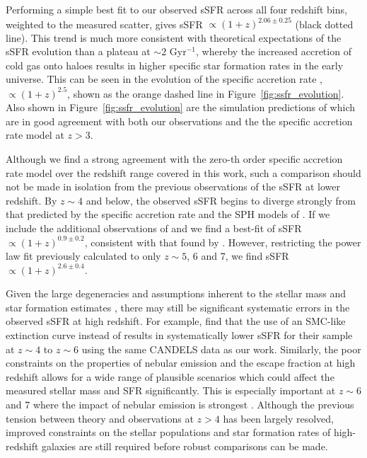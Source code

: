 Performing a simple best fit to our observed sSFR across all four redshift bins, weighted to the measured scatter, gives sSFR $\propto (1 + z)^{2.06 \pm 0.25}$ (black dotted line). This trend is much more consistent with theoretical expectations of the sSFR evolution than a plateau at $\sim 2$ Gyr$^{-1}$, whereby the increased accretion of cold gas onto haloes results in higher specific star formation rates in the early universe. This can be seen in the evolution of the specific accretion rate \citep{Neistein:2007fg,Dekel:2013id}, $\propto (1 + z)^{2.5}$, shown as the orange dashed line in Figure~\ref{fig:ssfr_evolution}. Also shown in Figure~\ref{fig:ssfr_evolution} are the simulation predictions of \citet{Dave:2013bf} which are in good agreement with both our observations and the the specific accretion rate model at $z > 3$. 

Although we find a strong agreement with the zero-th order specific accretion rate model over the redshift range covered in this work, such a comparison should not be made in isolation from the previous observations of the sSFR at lower redshift. By $z \sim 4$ and below, the observed sSFR begins to diverge strongly from that predicted by the specific accretion rate and the SPH models of \citet{Dave:2013bf}. If we include the additional observations of \citet{2007ApJ...670..156D} and \citet{2012ApJ...754...25R} we find a best-fit of sSFR $\propto (1 + z)^{0.9 \pm 0.2}$, consistent with that found by \citet{Gonzalez:2014do}. However, restricting the power law fit previously calculated to only $z \sim 5$, 6 and 7, we find sSFR $\propto (1 + z)^{2.6 \pm 0.4}$.

Given the large degeneracies and assumptions inherent to the stellar mass and star formation estimates \citep{deBarros:2012wa,2013A&A...549A...4S}, there may still be significant systematic errors in the observed sSFR at high redshift. For example, \citet{Salmon:2014tm} find that the use of an SMC-like extinction curve instead of \citet{2000ApJ...533..682C} results in systematically lower sSFR for their sample at $z \sim 4$ to $z \sim 6$ using the same CANDELS data as our work. Similarly, the poor constraints on the properties of nebular emission and the escape fraction at high redshift allows for a wide range of plausible scenarios which could affect the measured stellar mass and SFR significantly. This is especially important at $z \sim 6$ and 7 where the impact of nebular emission is strongest \citep{Stark:2013ix,Smit:2013ud,Gonzalez:2014do}. Although the previous tension between theory and observations at $z > 4$ has been largely resolved, improved constraints on the stellar populations and star formation rates of high-redshift galaxies are still required before robust comparisons can be made. 

